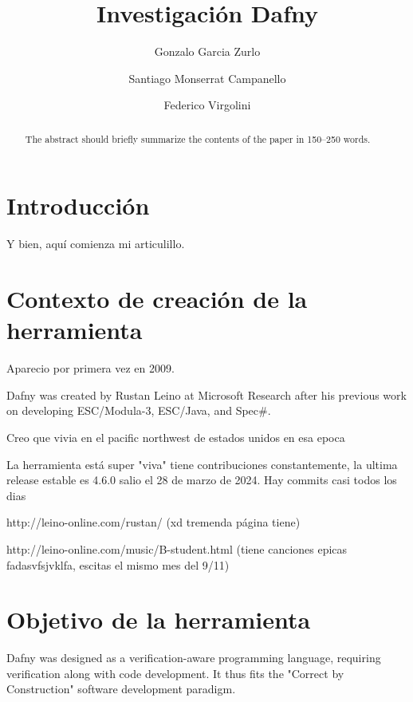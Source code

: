 \documentclass[runningheads]{llncs}
\begin{document}
%
\title{Investigación Dafny}
%
\author{Gonzalo Garcia Zurlo \and
Santiago Monserrat Campanello \and
Federico Virgolini}
%
%
%
\maketitle
\begin{abstract}
    The abstract should briefly summarize the contents of the paper in
    150--250 words.
\end{abstract}
%
\tableofcontents
\section{Introducción}
Y bien, aquí comienza mi articulillo.
\section{Contexto de creación de la herramienta}
Aparecio por primera vez en 2009.

Dafny was created by Rustan Leino at Microsoft Research
after his previous work on developing ESC/Modula-3, ESC/Java, and Spec\#.

Creo que vivia en el pacific northwest de estados unidos en esa epoca

La herramienta está super "viva" tiene contribuciones constantemente, la ultima release estable es 4.6.0 salio el 28 de marzo de 2024. Hay commits casi todos los dias

http://leino-online.com/rustan/ (xd tremenda página tiene)

http://leino-online.com/music/B-student.html (tiene canciones epicas fadasvfsjvklfa, escitas el mismo mes del 9/11)

\section{Objetivo de la herramienta}
Dafny was designed as a verification-aware programming language, requiring verification along with code development. It thus fits the "Correct by Construction" software development paradigm.
\end{document}
